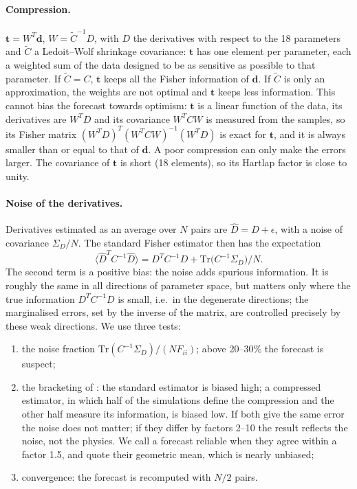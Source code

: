 \paragraph{Compression.} $\boldsymbol t = W^T\boldsymbol d$, $W=\tilde C^{-1}D$, with $D$ the derivatives with respect to the 18 parameters and $\tilde C$ a Ledoit--Wolf shrinkage covariance: $\boldsymbol t$ has one element per parameter, each a weighted sum of the data designed to be as sensitive as possible to that parameter. If $\tilde C=C$, $\boldsymbol t$ keeps all the Fisher information of $\boldsymbol d$. If $\tilde C$ is only an approximation, the weights are not optimal and $\boldsymbol t$ keeps less information. This cannot bias the forecast towards optimism: $\boldsymbol t$ is a linear function of the data, its derivatives are $W^TD$ and its covariance $W^TCW$ is measured from the samples, so its Fisher matrix $(W^TD)^T(W^TCW)^{-1}(W^TD)$ is exact for $\boldsymbol t$, and it is always smaller than or equal to that of $\boldsymbol d$. A poor compression can only make the errors larger. The covariance of $\boldsymbol t$ is short (18 elements), so its Hartlap factor is close to unity.

\paragraph{Noise of the derivatives.} Derivatives estimated as an average over $N$ pairs are $\hat D = D + \epsilon$, with a noise of covariance $\Sigma_D/N$. The standard Fisher estimator then has the expectation
\begin{equation}
\langle \hat D^T C^{-1}\hat D\rangle = D^T C^{-1} D + \mathrm{Tr}\big(C^{-1}\Sigma_D\big)/N .
\end{equation}
The second term is a positive bias: the noise adds spurious information. It is roughly the same in all directions of parameter space, but matters only where the true information $D^TC^{-1}D$ is small, i.e.\ in the degenerate directions; the marginalised errors, set by the inverse of the matrix, are controlled precisely by these weak directions. We use three tests:
\begin{enumerate}
\item the noise fraction $\mathrm{Tr}(C^{-1}\Sigma_D)/(N F_{ii})$; above 20--30\% the forecast is suspect;
\item the bracketing of \cite{CoultonWandelt2023}: the standard estimator is biased high; a compressed estimator, in which half of the simulations define the compression and the other half measure its information, is biased low. If both give the same error the noise does not matter; if they differ by factors 2--10 the result reflects the noise, not the physics. We call a forecast reliable when they agree within a factor 1.5, and quote their geometric mean, which is nearly unbiased;
\item convergence: the forecast is recomputed with $N/2$ pairs.
\end{enumerate}

